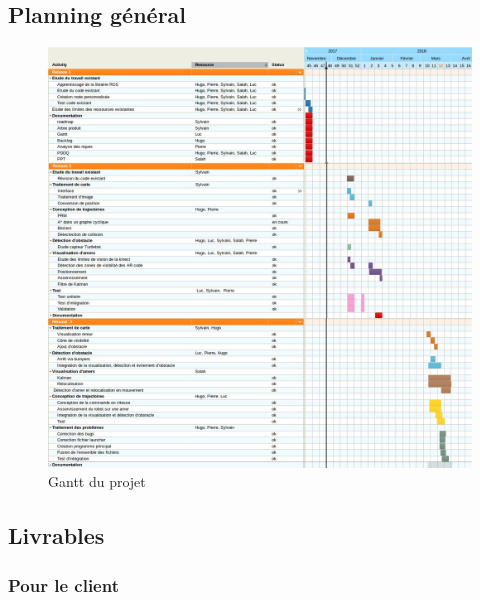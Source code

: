 \documentclass[10pt,a4paper]{article}
\begin{document}
\newpage
\subsection{Planning général}

\begin{figure}[!h]
  \centering
\noindent\centerline{\includegraphics[scale=0.4]{Gantt.jpg}}
  \caption{Gantt du projet}
\end{figure}


\subsection{Livrables}

\subsubsection{Pour le client}
\end{document}
